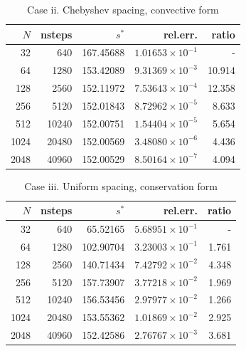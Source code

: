 \documentclass[11pt]{article}
\begin{document}
\begin{table}[H]
\centering
\caption{Case ii. Chebyshev spacing, convective form}
\begin{tabular}{@{}rrrrr@{}}
\toprule
$N$ & nsteps & $s^*$ & rel.err. & ratio \\
\midrule
  32 &   640 & 167.45688 & $1.01653 \times 10^{-1}$ & - \\
  64 &  1280 & 153.42089 & $9.31369 \times 10^{-3}$ & 10.914 \\
 128 &  2560 & 152.11972 & $7.53643 \times 10^{-4}$ & 12.358 \\
 256 &  5120 & 152.01843 & $8.72962 \times 10^{-5}$ & 8.633 \\
 512 & 10240 & 152.00751 & $1.54404 \times 10^{-5}$ & 5.654 \\
1024 & 20480 & 152.00569 & $3.48080 \times 10^{-6}$ & 4.436 \\
2048 & 40960 & 152.00529 & $8.50164 \times 10^{-7}$ & 4.094 \\
\bottomrule
\end{tabular}
\end{table}

\begin{table}[H]
\centering
\caption{Case iii. Uniform spacing, conservation form}
\begin{tabular}{@{}rrrrr@{}}
\toprule
$N$ & nsteps & $s^*$ & rel.err. & ratio \\
\midrule
  32 &   640 &  65.52165 & $5.68951 \times 10^{-1}$ & - \\
  64 &  1280 & 102.90704 & $3.23003 \times 10^{-1}$ & 1.761 \\
 128 &  2560 & 140.71434 & $7.42792 \times 10^{-2}$ & 4.348 \\
 256 &  5120 & 157.73907 & $3.77218 \times 10^{-2}$ & 1.969 \\
 512 & 10240 & 156.53456 & $2.97977 \times 10^{-2}$ & 1.266 \\
1024 & 20480 & 153.55362 & $1.01869 \times 10^{-2}$ & 2.925 \\
2048 & 40960 & 152.42586 & $2.76767 \times 10^{-3}$ & 3.681 \\
\bottomrule
\end{tabular}
\end{table}
\end{document}
